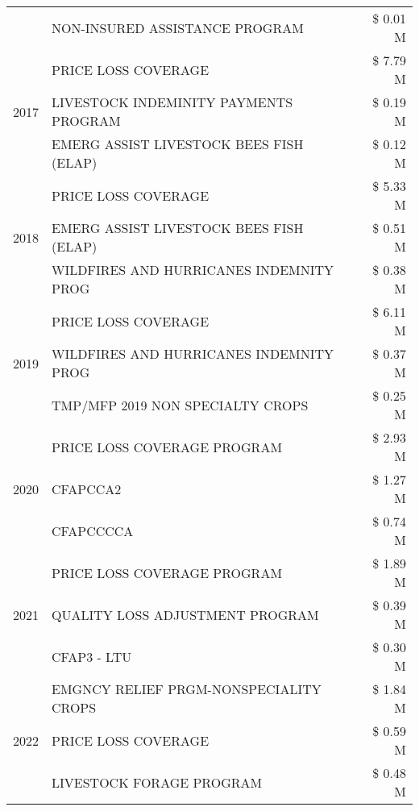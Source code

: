 \begin{tabular}{llr}
 & NON-INSURED ASSISTANCE PROGRAM & \$ 0.01 M \\
\cline{1-3}
\multirow[t]{3}{*}{2017} & PRICE LOSS COVERAGE & \$ 7.79 M \\
 & LIVESTOCK INDEMINITY PAYMENTS PROGRAM & \$ 0.19 M \\
 & EMERG ASSIST LIVESTOCK BEES FISH (ELAP) & \$ 0.12 M \\
\cline{1-3}
\multirow[t]{3}{*}{2018} & PRICE LOSS COVERAGE & \$ 5.33 M \\
 & EMERG ASSIST LIVESTOCK BEES FISH (ELAP) & \$ 0.51 M \\
 & WILDFIRES AND HURRICANES INDEMNITY PROG & \$ 0.38 M \\
\cline{1-3}
\multirow[t]{3}{*}{2019} & PRICE LOSS COVERAGE & \$ 6.11 M \\
 & WILDFIRES AND HURRICANES INDEMNITY PROG & \$ 0.37 M \\
 & TMP/MFP 2019 NON SPECIALTY CROPS & \$ 0.25 M \\
\cline{1-3}
\multirow[t]{3}{*}{2020} & PRICE LOSS COVERAGE PROGRAM & \$ 2.93 M \\
 & CFAPCCA2 & \$ 1.27 M \\
 & CFAPCCCCA & \$ 0.74 M \\
\cline{1-3}
\multirow[t]{3}{*}{2021} & PRICE LOSS COVERAGE PROGRAM & \$ 1.89 M \\
 & QUALITY LOSS ADJUSTMENT PROGRAM & \$ 0.39 M \\
 & CFAP3 - LTU & \$ 0.30 M \\
\cline{1-3}
\multirow[t]{3}{*}{2022} & EMGNCY RELIEF PRGM-NONSPECIALITY CROPS & \$ 1.84 M \\
 & PRICE LOSS COVERAGE & \$ 0.59 M \\
 & LIVESTOCK FORAGE PROGRAM & \$ 0.48 M \\
\cline{1-3}
\bottomrule
\end{tabular}
